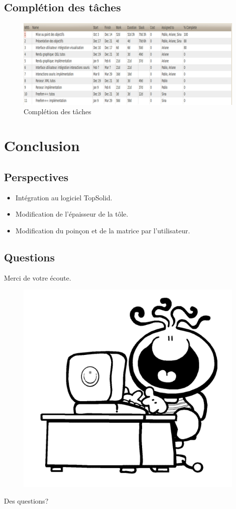 \documentclass{beamer}
\begin{document}
\subsection{Complétion des tâches}
\begin{frame}
    \begin{figure}
        \includegraphics[width=\textwidth]{img/ganttCompletionTasks.png}
        \caption{Complétion des tâches}
        \label{Complétion}
    \end{figure}
\end{frame}

\section{Conclusion}
\subsection{Perspectives}
\begin{frame}
    \begin{itemize}
        \item Intégration au logiciel TopSolid.
        \item Modification de l'épaisseur de la tôle.
        \item Modification du poinçon et de la matrice par l'utilisateur.
    \end{itemize}
\end{frame}
\subsection{Questions}
\begin{frame}
    Merci de votre écoute.
    \begin{figure}
        \includegraphics[width=.55\textwidth]{img/conclusion.png}
        \label{Conclusion}
    \end{figure}
    \hfill Des questions?
\end{frame}
\end{document}
